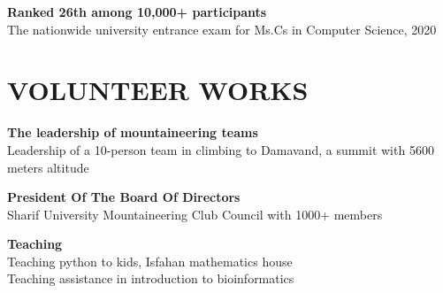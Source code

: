 \documentclass[9pt, letterpaper]{extarticle}
\begin{document}
\begin{minipage}[t]{0.32\textwidth}
\vspace{0.08cm}
\textbf{Ranked 26th among 10,000+ participants} \\[0.025cm]
The nationwide university entrance exam for Ms.Cs in Computer Science, 2020

\section{VOLUNTEER WORKS}
\small

\textbf{The leadership of mountaineering teams} \\[0.025cm]
Leadership of a 10-person team in climbing to Damavand, a summit with 5600 meters altitude

\vspace{0.08cm}
\textbf{President Of The Board Of Directors} \\[0.025cm]
Sharif University Mountaineering Club Council with 1000+ members

\vspace{0.08cm}
\textbf{Teaching} \\[0.025cm]
Teaching python to kids, Isfahan mathematics house \\[0.025cm]
Teaching assistance in introduction to bioinformatics

\end{minipage}
\end{document}
